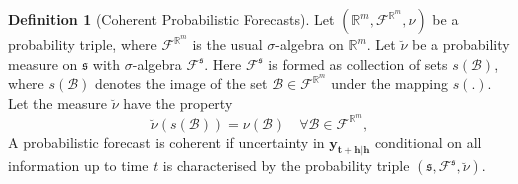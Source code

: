 \documentclass[a4paper, 11pt]{article}
\theoremstyle{theo}
\theoremstyle{definition}
\newtheorem{definition}{Definition}[section]
\begin{document}
\begin{definition}[Coherent Probabilistic Forecasts]\label{def:cohprob}
  Let $(\mathbb{R}^m, \mathscr{F}^{\mathbb{R}^m}, \nu)$ be a probability triple, where $\mathscr{F}^{\mathbb{R}^m}$ is the usual $\sigma$-algebra on $\mathbb{R}^m$. Let $\breve{\nu}$ be a probability measure on $\mathfrak{s}$ with $\sigma$-algebra $\mathscr{F}^{\mathfrak{s}}$.  Here $\mathscr{F}^{\mathfrak{s}}$ is formed as collection of sets $s(\mathcal{B})$, where $s(\mathcal{B})$ denotes the image of the set $\mathcal{B}\in \mathscr{F}^{\mathbb{R}^m}$ under the mapping $s(.)$.  Let the measure $\breve{\nu}$ have the property
  $$
      \breve{\nu}(s(\mathcal{B})) = \nu(\mathcal{B}) \quad \forall  \mathcal{B} \in \mathscr{F}^{\mathbb{R}^m},
    $$  
  A probabilistic forecast is coherent if uncertainty in $\bm{y_{t+h|h}}$ conditional on all information up to time $t$ is characterised by the probability triple $(\mathfrak{s},\mathscr{F}^{\mathfrak{s}},\breve{\nu})$.
\end{definition}



\end{document}
